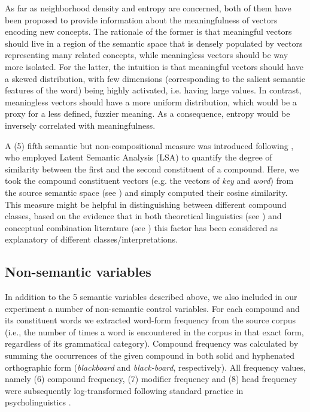 \documentclass[output=paper]{langsci/langscibook}
\begin{document}
As far as neighborhood density and entropy are concerned, both of them have been proposed to provide information about the meaningfulness of vectors encoding new concepts. The rationale of the former is that meaningful vectors should live in a region of the semantic space that is densely populated by vectors representing many related concepts, while meaningless vectors should be way more isolated. For the latter, the intuition is that meaningful vectors should have a skewed distribution, with few dimensions (corresponding to the salient semantic features of the word) being highly activated, i.e. having large values. In contrast, meaningless vectors should have a more uniform distribution, which would be a proxy for a less defined, fuzzier meaning. As a consequence, entropy would be inversely correlated with meaningfulness.

A (5) fifth semantic but non-compositional measure was introduced following \cite{lynott2001}, who employed Latent Semantic Analysis (LSA) to quantify the degree of similarity between the first and the second constituent of a compound. Here, we took the compound constituent vectors (e.g. the vectors of \emph{key} and \emph{word}) from the source semantic space (see ) and simply computed their cosine similarity. This measure might be helpful in distinguishing between different compound classes, based on the evidence that in both theoretical linguistics (see \citealt{lieber5OHC}) and conceptual combination literature (see \citealt{wisniewski1996}) this factor has been considered as explanatory of different classes/interpretations.

\subsection{Non-semantic variables}

In addition to the 5 semantic variables described above, we also included in our experiment a number of non-semantic control variables. For each compound and its constituent words we extracted word-form frequency from the source corpus (i.e., the number of times a word is encountered in the corpus in that exact form, regardless of its grammatical category). Compound frequency was calculated by summing the occurrences of the given compound in both solid and hyphenated orthographic form (\emph{blackboard} and \emph{black-board}, respectively). All frequency values, namely (6) compound frequency, (7) modifier frequency and (8) head frequency were subsequently log-transformed following standard practice in psycholinguistics \citep{brysbaert2018}.
\end{document}
